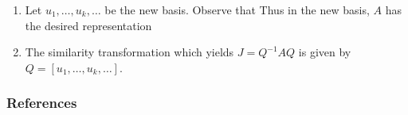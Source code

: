 \documentclass[aspectratio=169]{beamer}
\begin{document}
\begin{frame}
\begin{enumerate}
\item Let $u_1,\ldots,u_k,\ldots$ be the new basis. Observe that
Thus in the new basis, $A$ has the desired representation
\item The similarity transformation which yields $J=Q^{-1}AQ$ is given
by $Q=[u_1,\ldots,u_k,\ldots]$.
\end{enumerate}
\end{frame}


\begin{frame}[allowframebreaks]
    \frametitle{References}
    
    
    \end{frame}
    
    
\end{document}
